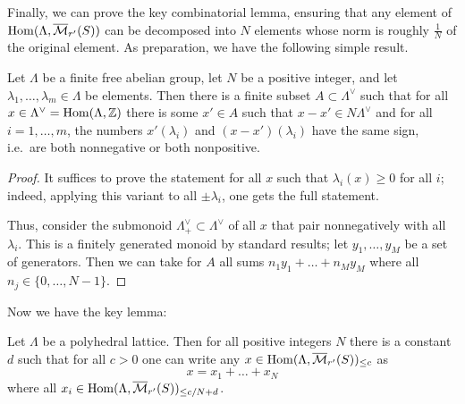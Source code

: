 Finally, we can prove the key combinatorial lemma,
ensuring that any element of $\operatorname{Hom}(\Lambda,\overline{\mathcal M}_{r'}(S))$
can be decomposed into $N$ elements whose norm is roughly $\tfrac 1N$ of the original element.
As preparation, we have the following simple result.

\begin{lemma}
  \label{combi_aux}
  \leanok
  Let $\Lambda$ be a finite free abelian group,
  let $N$ be a positive integer,
  and let $\lambda_1,\ldots,\lambda_m\in \Lambda$ be elements.
  Then there is a finite subset $A\subset \Lambda^\vee$
  such that for all $x\in \Lambda^\vee=\operatorname{Hom}(\Lambda,\mathbb Z)$
  there is some $x'\in A$ such that $x-x'\in N\Lambda^\vee$
  and for all $i=1,\ldots,m$,
  the numbers $x'(\lambda_i)$ and $(x-x')(\lambda_i)$ have the same sign,
  i.e.~are both nonnegative or both nonpositive.
\end{lemma}

\begin{proof}
  It suffices to prove the statement for all $x$ such that $\lambda_i(x)\geq 0$ for all $i$;
  indeed, applying this variant to all $\pm \lambda_i$, one gets the full statement.

  Thus, consider the submonoid $\Lambda^\vee_+\subset \Lambda^\vee$
  of all $x$ that pair nonnegatively with all $\lambda_i$.
  This is a finitely generated monoid by standard results;
  let $y_1,\ldots,y_M$ be a set of generators.
  Then we can take for $A$ all sums $n_1y_1+\ldots+n_My_M$ where all $n_j\in \{0,\ldots,N-1\}$.
\end{proof}

Now we have the key lemma:

\begin{lemma}
  \label{combi}
  \leanok
  Let $\Lambda$ be a polyhedral lattice.
  Then for all positive integers $N$ there is a constant $d$
  such that for all $c>0$ one can write any
  $x\in \operatorname{Hom}(\Lambda,\overline{\mathcal M}_{r'}(S))_{\leq c}$ as
  \[
    x=x_1+\ldots+x_N
  \]
  where all $x_i\in \operatorname{Hom}(\Lambda,\overline{\mathcal M}_{r'}(S))_{\leq c/N+d}$.
\end{lemma}

